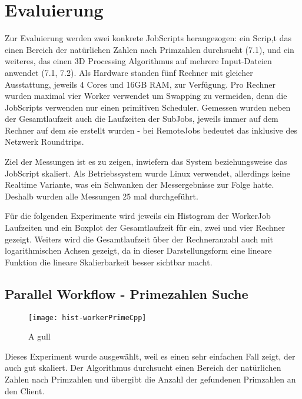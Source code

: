 
\chapter{Evaluierung}
Zur Evaluierung werden zwei konkrete JobScripts herangezogen: ein Scrip,t das einen Bereich der natürlichen Zahlen nach Primzahlen durchsucht (7.1), und ein weiteres, das einen 3D Processing Algorithmus auf mehrere Input-Dateien anwendet (7.1, 7.2).
Als Hardware standen fünf Rechner mit gleicher Ausstattung, jeweils 4 Cores und 16GB RAM, zur Verfügung. Pro Rechner wurden maximal vier Worker verwendet um Swapping zu vermeiden, denn die JobScripts verwenden nur einen primitiven Scheduler.
Gemessen wurden neben der Gesamtlaufzeit auch die Laufzeiten der SubJobs, jeweils immer auf dem Rechner auf dem sie erstellt wurden - bei RemoteJobs bedeutet das inklusive des Netzwerk Roundtrips.

Ziel der Messungen ist es zu zeigen, inwiefern das System beziehungsweise das JobScript skaliert. Als Betriebssystem wurde Linux verwendet, allerdings keine Realtime Variante, was ein Schwanken der Messergebnisse zur Folge hatte. Deshalb wurden alle Messungen 25 mal durchgeführt.

Für die folgenden Experimente wird jeweils ein Histogram der WorkerJob Laufzeiten und ein Boxplot der Gesamtlaufzeit für ein, zwei und vier Rechner gezeigt. Weiters wird die Gesamtlaufzeit über der Rechneranzahl auch mit logarithmischen Achsen gezeigt, da in dieser Darstellungsform eine lineare Funktion die lineare Skalierbarkeit besser sichtbar macht.





\clearpage
\section{Parallel Workflow - Primezahlen Suche}

\begin{wrapfigure}{r}{0.42\textwidth}
  \vspace{-20pt}
  \begin{center}
    \texttt{[image: hist-workerPrimeCpp]}
  \end{center}
  \caption{A gull}
\end{wrapfigure}

Dieses Experiment wurde ausgewählt, weil es einen sehr einfachen Fall zeigt, der auch gut skaliert.
Der Algorithmus durchsucht einen Bereich der natürlichen Zahlen nach Primzahlen und übergibt die Anzahl der gefundenen Primzahlen an den Client.

